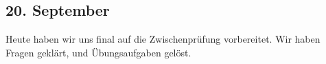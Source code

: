 \subsection{20. September}
Heute haben wir uns final auf die Zwischenprüfung vorbereitet. Wir haben Fragen geklärt, und Übungsaufgaben gelöst. 